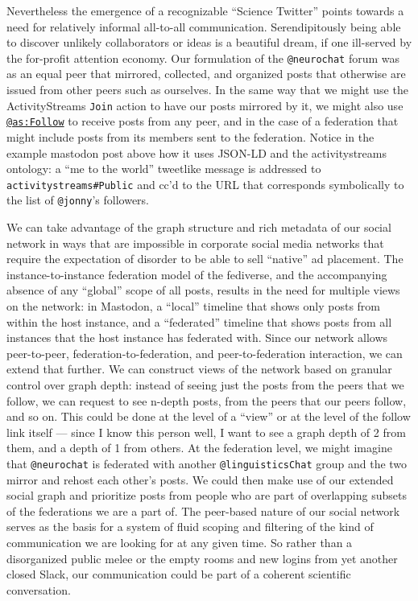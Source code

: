 Nevertheless the emergence of a recognizable ``Science Twitter'' points
towards a need for relatively informal all-to-all communication.
Serendipitously being able to discover unlikely collaborators or ideas
is a beautiful dream, if one ill-served by the for-profit attention
economy. Our formulation of the \texttt{@neurochat} forum was as an
equal peer that mirrored, collected, and organized posts that otherwise
are issued from other peers such as ourselves. In the same way that we
might use the ActivityStreams \texttt{Join} action to have our posts
mirrored by it, we might also use
\href{https://www.w3.org/TR/activitystreams-vocabulary/\#dfn-follow}{\texttt{@as:Follow}}
to receive posts from any peer, and in the case of a federation that
might include posts from its members sent to the federation. Notice in
the example mastodon post above how it uses JSON-LD and the
activitystreams ontology: a ``me to the world'' tweetlike message is
addressed to \texttt{activitystreams\#Public} and cc'd to the URL that
corresponds symbolically to the list of \texttt{@jonny}'s followers.

We can take advantage of the graph structure and rich metadata of our
social network in ways that are impossible in corporate social media
networks that require the expectation of disorder to be able to sell
``native'' ad placement. The instance-to-instance federation model of
the fediverse, and the accompanying absence of any ``global'' scope of
all posts, results in the need for multiple views on the network: in
Mastodon, a ``local'' timeline that shows only posts from within the
host instance, and a ``federated'' timeline that shows posts from all
instances that the host instance has federated with. Since our network
allows peer-to-peer, federation-to-federation, and peer-to-federation
interaction, we can extend that further. We can construct views of the
network based on granular control over graph depth: instead of seeing
just the posts from the peers that we follow, we can request to see
n-depth posts, from the peers that our peers follow, and so on. This
could be done at the level of a ``view'' or at the level of the follow
link itself --- since I know this person well, I want to see a graph
depth of 2 from them, and a depth of 1 from others. At the federation
level, we might imagine that \texttt{@neurochat} is federated with
another \texttt{@linguisticsChat} group and the two mirror and rehost
each other's posts. We could then make use of our extended social graph
and prioritize posts from people who are part of overlapping subsets of
the federations we are a part of. The peer-based nature of our social
network serves as the basis for a system of fluid scoping and filtering
of the kind of communication we are looking for at any given time. So
rather than a disorganized public melee or the empty rooms and new
logins from yet another closed Slack, our communication could be part of
a coherent scientific conversation.

